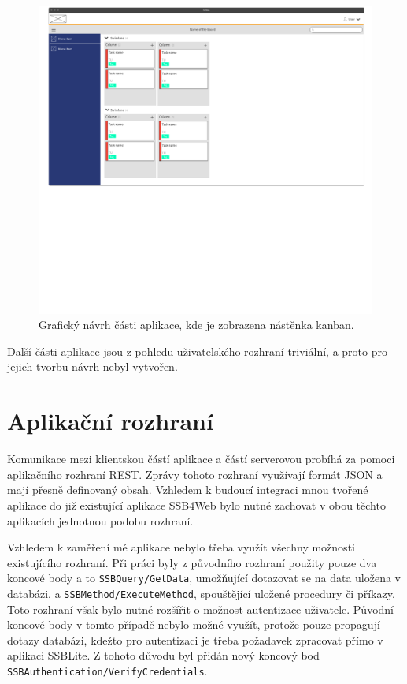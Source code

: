 \begin{figure}[H]
	\centering
	\label{img:design-kanban}
	\includegraphics[width=\textwidth]{obrazky-figures/ui-design.pdf}
	\caption{Grafický návrh části aplikace, kde je zobrazena nástěnka kanban.}
\end{figure}

Další části aplikace jsou z pohledu uživatelského rozhraní triviální, a proto pro jejich tvorbu návrh nebyl vytvořen.


\section{Aplikační rozhraní}\label{sec:api}
Komunikace mezi klientskou částí aplikace a částí serverovou probíhá za pomoci aplikačního rozhraní REST. Zprávy tohoto rozhraní využívají formát JSON a mají přesně definovaný obsah.
Vzhledem k budoucí integraci mnou tvořené aplikace do již existující aplikace SSB4Web bylo nutné zachovat v obou těchto aplikacích jednotnou podobu rozhraní.

Vzhledem k zaměření mé aplikace nebylo třeba využít všechny možnosti existujícího rozhraní. Při práci byly z původního rozhraní použity pouze dva koncové body a to \texttt{SSBQuery/GetData}, umožňující dotazovat se na data uložena v databázi, a \sloppy\texttt{SSBMethod/ExecuteMethod}, spouštějící uložené procedury či příkazy. Toto rozhraní však bylo nutné rozšířit o možnost autentizace uživatele. Původní koncové body v tomto případě nebylo možné využít, protože pouze propagují dotazy databázi, kdežto pro autentizaci je třeba požadavek zpracovat přímo v aplikaci SSBLite. Z tohoto důvodu byl přidán nový koncový bod \sloppy\texttt{SSBAuthentication/VerifyCredentials}.

